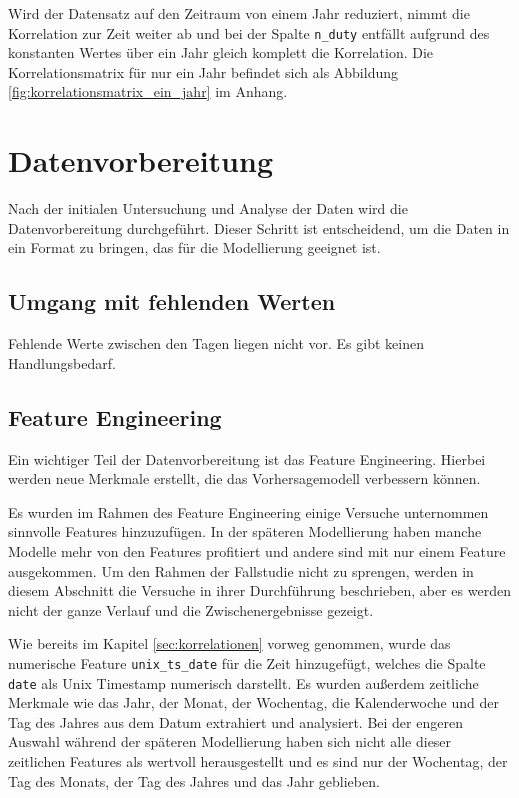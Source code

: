 \documentclass[%
pdftex,
oneside,			%
11pt,				%
parskip=half,		%
headheight = 12pt,	%
headsepline,		%
footsepline,		%
footheight = 16pt,	%
abstracton,		%
DIV=calc,		%
BCOR=8mm,		%
headinclude=false,	%
footinclude=false,	%
listof=totoc,		%
toc=bibliography,	%
]{scrreprt}	%
\begin{document}
            Wird der Datensatz auf den Zeitraum von einem Jahr reduziert, nimmt die Korrelation zur Zeit weiter ab und bei der Spalte \texttt{n\_duty} entfällt aufgrund des konstanten Wertes über ein Jahr gleich komplett die Korrelation.
            Die Korrelationsmatrix für nur ein Jahr befindet sich als Abbildung \ref{fig:korrelationsmatrix_ein_jahr} im Anhang. 


    \section{Datenvorbereitung}

        Nach der initialen Untersuchung und Analyse der Daten wird die Datenvorbereitung durchgeführt. 
        Dieser Schritt ist entscheidend, um die Daten in ein Format zu bringen, das für die Modellierung geeignet ist.

        \subsection{Umgang mit fehlenden Werten}

            Fehlende Werte zwischen den Tagen liegen nicht vor.
            Es gibt keinen Handlungsbedarf.

        \subsection{Feature Engineering}
            \label{sec:feature_engineering}

            Ein wichtiger Teil der Datenvorbereitung ist das Feature Engineering. 
            Hierbei werden neue Merkmale erstellt, die das Vorhersagemodell verbessern können. 

            Es wurden im Rahmen des Feature Engineering einige Versuche unternommen sinnvolle Features hinzuzufügen.
            In der späteren Modellierung haben manche Modelle mehr von den Features profitiert und andere sind mit nur einem Feature ausgekommen.
            Um den Rahmen der Fallstudie nicht zu sprengen, werden in diesem Abschnitt die Versuche in ihrer Durchführung beschrieben, aber es werden nicht der ganze Verlauf und die Zwischenergebnisse gezeigt.

            Wie bereits im Kapitel \ref{sec:korrelationen} vorweg genommen, wurde das numerische Feature \texttt{unix\_ts\_date} für die Zeit hinzugefügt, welches die Spalte \texttt{date} als Unix Timestamp numerisch darstellt.
            Es wurden außerdem zeitliche Merkmale wie das Jahr, der Monat, der Wochentag, die Kalenderwoche und der Tag des Jahres aus dem Datum extrahiert und analysiert.
            Bei der engeren Auswahl während der späteren Modellierung haben sich nicht alle dieser zeitlichen Features als wertvoll herausgestellt und es sind nur der Wochentag, der Tag des Monats, der Tag des Jahres und das Jahr geblieben.
\end{document}
